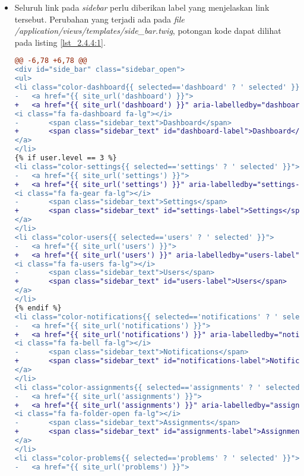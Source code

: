 \begin{itemize}
	\item Seluruh link pada \textit{sidebar} perlu diberikan label yang menjelaskan link tersebut. Perubahan yang terjadi ada pada \textit{file} \textit{/application/views/templates/side\_bar.twig}, potongan kode dapat dilihat pada listing \ref{lst_2.4.4:1}.
	
\begin{lstlisting}[language=diff, caption=Perubahan pada \textit{file} \textit{side\_bar.twig}, label=lst_2.4.4:1, basicstyle=\ttfamily, frame=single,
columns=fullflexible, keepspaces=true, breaklines=true]
@@ -6,78 +6,78 @@
<div id="side_bar" class="sidebar_open">
<ul>
<li class="color-dashboard{{ selected=='dashboard' ? ' selected' }}">
- 	<a href="{{ site_url('dashboard') }}">
+ 	<a href="{{ site_url('dashboard') }}" aria-labelledby="dashboard-label">
<i class="fa fa-dashboard fa-lg"></i>
- 		<span class="sidebar_text">Dashboard</span>
+ 		<span class="sidebar_text" id="dashboard-label">Dashboard</span>
</a>
</li>
{% if user.level == 3 %}
<li class="color-settings{{ selected=='settings' ? ' selected' }}">
- 	<a href="{{ site_url('settings') }}">
+ 	<a href="{{ site_url('settings') }}" aria-labelledby="settings-label">
<i class="fa fa-gear fa-lg"></i>
- 		<span class="sidebar_text">Settings</span>
+ 		<span class="sidebar_text" id="settings-label">Settings</span>
</a>
</li>
<li class="color-users{{ selected=='users' ? ' selected' }}">
- 	<a href="{{ site_url('users') }}">
+ 	<a href="{{ site_url('users') }}" aria-labelledby="users-label">
<i class="fa fa-users fa-lg"></i>
- 		<span class="sidebar_text">Users</span>
+ 		<span class="sidebar_text" id="users-label">Users</span>
</a>
</li>
{% endif %}
<li class="color-notifications{{ selected=='notifications' ? ' selected' }}">
- 	<a href="{{ site_url('notifications') }}">
+ 	<a href="{{ site_url('notifications') }}" aria-labelledby="notifications-label">
<i class="fa fa-bell fa-lg"></i>
- 		<span class="sidebar_text">Notifications</span>
+ 		<span class="sidebar_text" id="notifications-label">Notifications</span>
</a>
</li>
<li class="color-assignments{{ selected=='assignments' ? ' selected' }}">
- 	<a href="{{ site_url('assignments') }}">
+ 	<a href="{{ site_url('assignments') }}" aria-labelledby="assignments-label">
<i class="fa fa-folder-open fa-lg"></i>
- 		<span class="sidebar_text">Assignments</span>
+ 		<span class="sidebar_text" id="assignments-label">Assignments</span>
</a>
</li>
<li class="color-problems{{ selected=='problems' ? ' selected' }}">
- 	<a href="{{ site_url('problems') }}">

\end{lstlisting}
\end{itemize}
